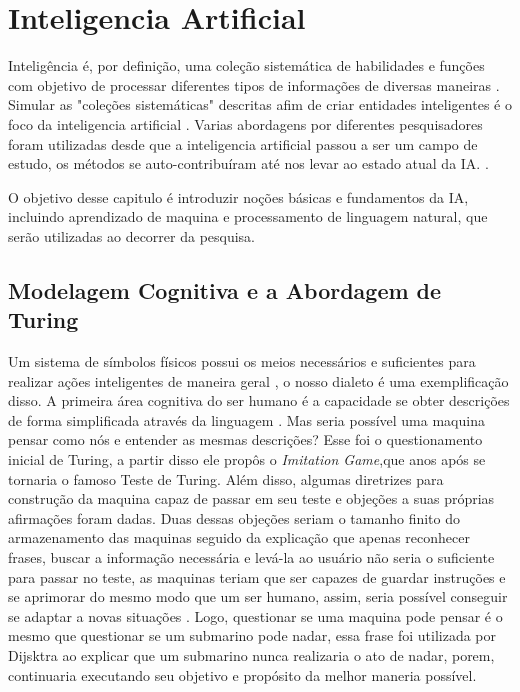 \documentclass[
	12pt,				%
	openright,			%
	twoside,			%
	a4paper,			%
	english,			%
	french,				%
	spanish,			%
	brazil				%
	]{abntex2}
\begin{document}


\chapter{Inteligencia Artificial}
Inteligência é, por definição, uma coleção sistemática de habilidades e funções com objetivo de processar diferentes tipos de informações de diversas maneiras \cite[49]{guilford1982cognitive}. Simular as "coleções sistemáticas" descritas afim de criar entidades inteligentes é o foco da inteligencia artificial \cite[1]{russell2003artificial}. Varias abordagens por diferentes pesquisadores foram utilizadas desde que a inteligencia artificial passou a ser um campo de estudo, os métodos se auto-contribuíram até nos levar ao estado atual da IA. \cite[2]{russell2003artificial}.

O objetivo desse capitulo é introduzir noções básicas e fundamentos da IA, incluindo aprendizado de maquina e processamento de linguagem natural, que serão utilizadas ao decorrer da pesquisa.

\section{Modelagem Cognitiva e a Abordagem de Turing}
Um sistema de símbolos físicos possui os meios necessários e suficientes para realizar ações inteligentes de maneira geral \cite[116]{newell1976ComputerSA}, o nosso dialeto é uma exemplificação disso. A primeira área cognitiva do ser humano é a capacidade se obter descrições de forma simplificada através da linguagem \cite[131]{putnam1975mind}. Mas seria possível uma maquina pensar como nós e entender as mesmas descrições? Esse foi o questionamento inicial de Turing, a partir disso ele propôs o \textit{Imitation Game},que anos após se tornaria o famoso Teste de Turing. Além disso, algumas diretrizes para construção da maquina capaz de passar em seu teste e objeções a suas próprias afirmações foram dadas. Duas dessas objeções seriam o tamanho finito do armazenamento das maquinas seguido da explicação que apenas reconhecer frases, buscar a informação necessária e levá-la ao usuário não seria o suficiente para passar no teste, as maquinas teriam que ser capazes de guardar instruções e se aprimorar do mesmo modo que um ser humano, assim, seria possível conseguir se adaptar a novas situações \cite[144-155]{turing1950}. Logo, questionar se uma maquina pode pensar é o mesmo que questionar se um submarino pode nadar, essa frase foi utilizada por Dijsktra \cite{dijkstra898} ao explicar que um submarino nunca realizaria o ato de nadar, porem, continuaria executando seu objetivo e propósito da melhor maneria possível.
\end{document}
